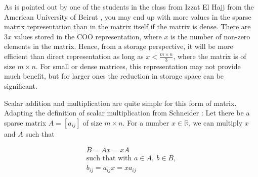 \documentclass[10pt,letterpaper,final]{report}
\begin{document}
As is pointed out by one of the students in the class from Izzat El Hajj from the American University of Beirut \parencite{IzzatElHajj2022Lecture}, you may end up with more values in the sparse matrix representation than in the matrix itself if the matrix is dense. There are $3x$ values stored in the COO representation, where $x$ is the number of non-zero elements in the matrix. Hence, from a storage perspective, it will be more efficient than direct representation as long as $x < \frac{m \times n}{3}$, where the matrix is of size $m \times n$. For small or dense matrices, this representation may not provide much benefit, but for larger ones the reduction in storage space can be significant.

Scalar addition and multiplication are quite simple for this form of matrix. Adapting the definition of scalar multiplication from Schneider \parencite{Schneider1989MatricesAndLinear}: Let there be a sparse matrix $A = [a_{ij}]$ of size $m \times n$. For a number $x \in \mathbb{R}$, we can multiply $x$ and $A$ such that

\begin{align*}
    B = Ax = xA\\
    \text{such that with } a \in A,\ b \in B, \\
    b_{ij} = a_{ij}x = xa_{ij}
\end{align*}
\end{document}
